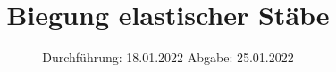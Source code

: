 

\subject{VERSUCH 103}
\title{Biegung elastischer Stäbe}
\date{%
  Durchführung: 18.01.2022
  \hspace{3em}
  Abgabe: 25.01.2022
}



\maketitle
\thispagestyle{empty}
\tableofcontents
\newpage






\printbibliography{}


